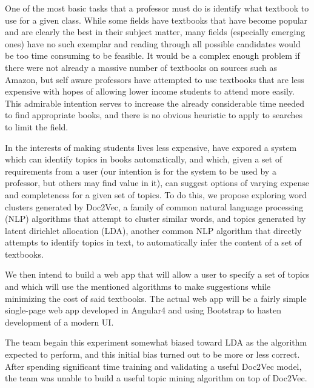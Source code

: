 One of the most basic tasks that a professor must do is identify what textbook to use for a given class.
While some fields have textbooks that have become popular and are
clearly the best in their subject matter, many fields (especially
emerging ones) have no such exemplar and reading through all possible
candidates would be too time consuming to be feasible.  
It would be a complex enough problem if there were not already a
massive number of textbooks on sources such as Amazon, but self aware
professors have attempted to use textbooks that are less expensive
with hopes of allowing lower income students to attend more easily.  
This admirable intention serves to increase the already considerable
time needed to find appropriate books, and there is no obvious
heuristic to apply to searches to limit the field.  

In the interests of making students lives less expensive, have 
expored a system which can identify topics in books automatically, and
which, given a set of requirements from a user (our intention is for
the system to be used by a professor, but others may find value in it),
can suggest options of varying expense and completeness for a given set of topics.  
To do this, we propose exploring word clusters generated by Doc2Vec, a
family of common natural language processing (NLP) algorithms that
attempt to cluster similar words, and topics generated by latent
dirichlet allocation (LDA), another common NLP algorithm that directly
attempts  to identify topics in text, to automatically infer the
content of a set of textbooks.  

We then intend to build a web app that will allow a user to specify a
set of topics and which will use the mentioned algorithms to make
suggestions while minimizing the cost of said textbooks.  
The actual web app will be a fairly simple single-page web app
developed in Angular4 and using Bootstrap to hasten development of a modern UI.  

The team begain this experiment somewhat biased toward LDA as the
algorithm expected to perform, and this initial bias turned out to be
more or less correct.
After spending significant time training and validating a useful
Doc2Vec model, the team was unable to build a useful topic mining
algorithm on top of Doc2Vec.

